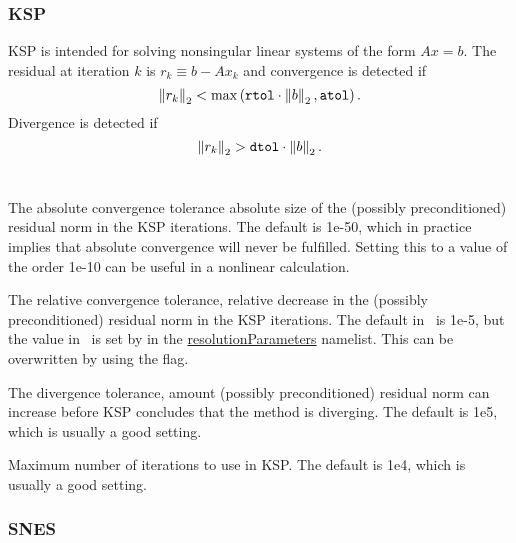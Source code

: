 \subsubsection{KSP}

KSP is intended for solving nonsingular linear systems of the form $A x = b$. 
The residual at iteration $k$ is $r_k \equiv b - A x_k$ and convergence is detected if
\[
\left\|r_k\right\|_2 < \mathrm{max} \left(\text{\ttfamily rtol} \cdot \left\|b\right\|_2, \text{\ttfamily atol}\right).
\]
Divergence is detected if
\[
\left\|r_k\right\|_2 > \text{\ttfamily dtol} \cdot \left\|b\right\|_2.
\]
\\

\myhrule

{The absolute convergence tolerance absolute size of the (possibly preconditioned) residual norm in the KSP iterations. 
The default is {\ttfamily 1e-50}, which in practice implies that absolute convergence will never be fulfilled. 
Setting this to a value of the order {\ttfamily 1e-10} can be useful in a nonlinear calculation.}

\myhrule

{The relative convergence tolerance, relative decrease in the (possibly preconditioned) residual norm in the KSP iterations. 
The default in \PETSc~is {\ttfamily 1e-5}, 
but the value in \sfincs~is set by  in the {\ttfamily \hyperref[sec:resolutionParameters]{resolutionParameters}} namelist. This can be overwritten by using the flag.}

\myhrule

{The divergence tolerance, amount (possibly preconditioned) residual norm can increase before KSP concludes that the method is diverging.
The default is {\ttfamily 1e5}, which is usually a good setting.}

\myhrule

{Maximum number of iterations to use in KSP. 
The default is {\ttfamily 1e4}, which is usually a good setting.} 

\subsubsection{SNES}

